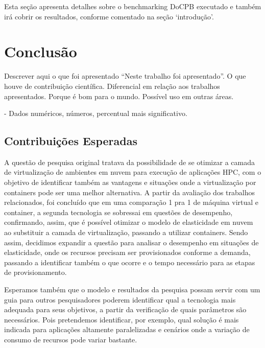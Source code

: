 \documentclass[twoside,english,brazilian]{UNISINOSartigo}
\begin{document}
Esta seção apresenta detalhes sobre o benchmarking DoCPB executado e também irá cobrir os resultados, conforme comentado na seção `introdução'. 




\chapter{Conclusão}
\label{conclusion}

Descrever aqui o que foi apresentado ``Neste trabalho foi apresentado''. O que houve de contribuição científica.
Diferencial em relação aos trabalhos apresentados. Porque é bom para o mundo.
Possível uso em outras áreas.

- Dados numéricos, números, percentual mais significativo.

\section{Contribuições Esperadas}
\label{contribuicoes}

A questão de pesquisa original tratava da possibilidade de se otimizar a camada de virtualização de ambientes em nuvem para execução de aplicações HPC, com o objetivo de identificar também as vantagens e situações onde a virtualização por containers pode ser uma melhor alternativa. A partir da avaliação dos trabalhos relacionados, foi concluído que em uma comparação 1 pra 1 de máquina virtual e container, a segunda tecnologia se sobressai em questões de desempenho, confirmando, assim, que é possível otimizar o modelo de elasticidade em nuvem ao substituir a camada de virtualização, passando a utilizar containers. Sendo assim, decidimos expandir a questão para analisar o desempenho em situações de elasticidade, onde os recursos precisam ser provisionados conforme a demanda, passando a identificar também o que ocorre e o tempo necessário para as etapas de provisionamento. 

Esperamos também que o modelo e resultados da pesquisa possam servir com um guia para outros pesquisadores poderem identificar qual a tecnologia mais adequada para seus objetivos, a partir da verificação de quais parâmetros são necessários. Pois pretendemos identificar, por exemplo, qual solução é mais indicada para aplicações altamente paralelizadas e cenários onde a variação de consumo de recursos pode variar bastante.
\end{document}
